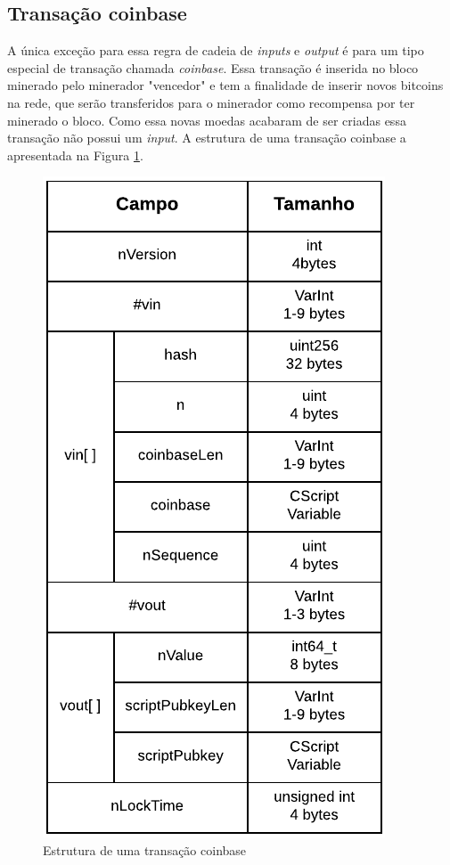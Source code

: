 \documentclass[conference,compsoc]{IEEEtran}
\begin{document}
\subsection*{Transação coinbase}

A única exceção para essa regra de cadeia de \textit{inputs} e \textit{output} é para um tipo especial de transação chamada \textit{coinbase}. Essa transação é inserida no bloco minerado pelo minerador "vencedor" e tem a finalidade de inserir novos bitcoins na rede, que serão transferidos para o minerador como recompensa por ter minerado o bloco. Como essa novas moedas acabaram de ser criadas essa transação não possui um \textit{input}. A estrutura de uma transação coinbase a apresentada na Figura \ref{fig:Estrutura_coinbase}.

\begin{figure}[H]
    \centering
    \includegraphics[keepaspectratio=true, scale=0.6]{img/Estrutura_coinbase.pdf}
    \caption{Estrutura de uma transação coinbase \cite{DevBitKO}}
    \label{fig:Estrutura_coinbase}
\end{figure}
\end{document}

